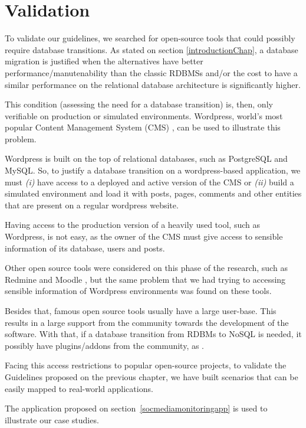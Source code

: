 \chapter{Validation}\label{validationChap}

To validate our guidelines, we searched for open-source tools that could possibly require database transitions. As stated on section \ref{introductionChap}, a database migration is justified when the alternatives have better performance/manutenability than the classic RDBMSs and/or the cost to have a similar performance on the relational database architecture is significantly higher.

This condition (assessing the need for a database transition) is, then, only verifiable on production or simulated environments. Wordpress\cite{wordpress}, world's most popular Content Management System (CMS)  \cite{cmsranking}, can be used to illustrate this problem.  

Wordpress is built on the top of relational databases, such as PostgreSQL and MySQL. So, to justify a database transition on a wordpress-based application, we must \textit{(i)} have access to a deployed and active version of the CMS or \textit{(ii)} build a simulated environment and load it with posts, pages, comments and other entities that are present on a regular wordpress website.

Having access to the production version of a heavily used tool, such as Wordpress, is not easy, as the owner of the CMS must give access to sensible information of its database, users and posts. 

Other open source tools were considered on this phase of the research, such as Redmine \cite{redmine} and Moodle \cite{moodle}, but the same problem that we had trying to accessing sensible information of Wordpress environments was found on these tools.

Besides that, famous open source tools usually have a large user-base. This results in a large support from the community towards the development of the software. With that, if a database transition from RDBMs to NoSQL is needed, it possibly have plugins/addons from the community, as \cite{fantasticElasticsearch}.

Facing this access restrictions to popular open-source projects, to validate the Guidelines proposed on the previous chapter, we have built scenarios that can be easily mapped to real-world applications.

The application proposed on section~\ref{socmediamonitoringapp} is used to illustrate our case studies.

